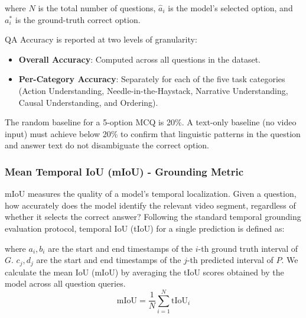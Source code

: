 \documentclass[sigconf,natbib=false,nonacm]{acmart}
\begin{document}
where $N$ is the total number of questions, $\hat{a}_i$ is the model's selected option, and $a_i^*$ is the ground-truth correct option.

QA Accuracy is reported at two levels of granularity:
\begin{itemize}
  \item \textbf{Overall Accuracy}: Computed across all questions in the dataset.
  \item \textbf{Per-Category Accuracy}: Separately for each of the five task categories (Action Understanding, Needle-in-the-Haystack, Narrative Understanding, Causal Understanding, and Ordering).
\end{itemize}

The random baseline for a 5-option MCQ is 20\%. A text-only baseline (no video input) must achieve below 20\% to confirm that linguistic patterns in the question and answer text do not disambiguate the correct option.

\subsubsection{Mean Temporal IoU (mIoU) - Grounding Metric}
mIoU measures the quality of a model's temporal localization. Given a question, how accurately does the model identify the relevant video segment, regardless of whether it selects the correct answer?
Following the standard temporal grounding evaluation protocol, temporal IoU (tIoU) for a single prediction is defined as:


where $a_{i}, b_{i}$ are the start and end timestamps of the $i$-th ground truth interval of $G$. $c_{j}, d_{j}$ are the start and end timestamps of the $j$-th predicted interval of $P$. We calculate the mean IoU (mIoU) by averaging the tIoU scores obtained by the model across all question queries. 
\begin{equation}
  \text{mIoU} = \frac{1}{N} \sum_{i=1}^{N} \text{tIoU}_{i}
\end{equation}
\end{document}
